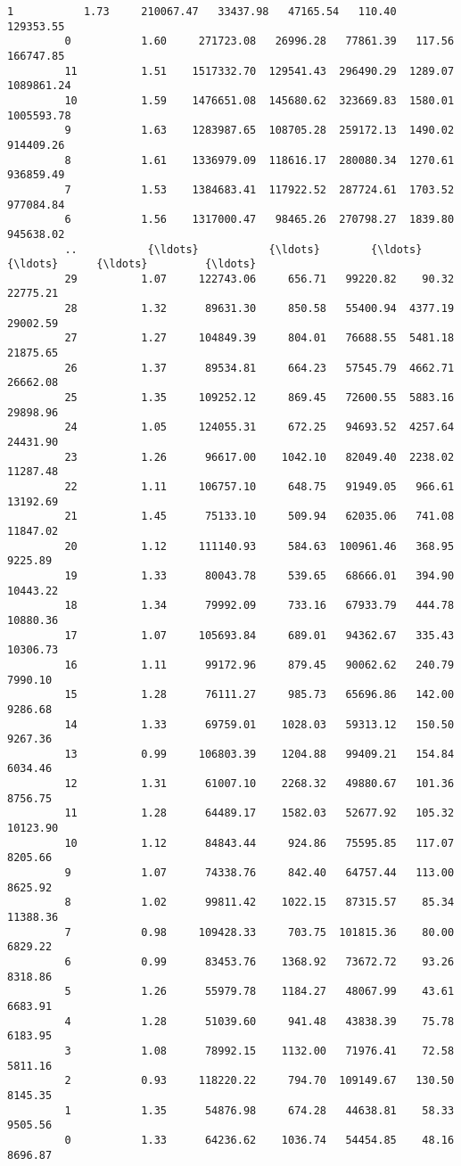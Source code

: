 \documentclass[11pt]{article}
\begin{document}
\begin{Verbatim}[commandchars=\\\{\}]
         1           1.73     210067.47   33437.98   47165.54   110.40   129353.55
         0           1.60     271723.08   26996.28   77861.39   117.56   166747.85
         11          1.51    1517332.70  129541.43  296490.29  1289.07  1089861.24
         10          1.59    1476651.08  145680.62  323669.83  1580.01  1005593.78
         9           1.63    1283987.65  108705.28  259172.13  1490.02   914409.26
         8           1.61    1336979.09  118616.17  280080.34  1270.61   936859.49
         7           1.53    1384683.41  117922.52  287724.61  1703.52   977084.84
         6           1.56    1317000.47   98465.26  270798.27  1839.80   945638.02
         ..           {\ldots}           {\ldots}        {\ldots}        {\ldots}      {\ldots}         {\ldots}
         29          1.07     122743.06     656.71   99220.82    90.32    22775.21
         28          1.32      89631.30     850.58   55400.94  4377.19    29002.59
         27          1.27     104849.39     804.01   76688.55  5481.18    21875.65
         26          1.37      89534.81     664.23   57545.79  4662.71    26662.08
         25          1.35     109252.12     869.45   72600.55  5883.16    29898.96
         24          1.05     124055.31     672.25   94693.52  4257.64    24431.90
         23          1.26      96617.00    1042.10   82049.40  2238.02    11287.48
         22          1.11     106757.10     648.75   91949.05   966.61    13192.69
         21          1.45      75133.10     509.94   62035.06   741.08    11847.02
         20          1.12     111140.93     584.63  100961.46   368.95     9225.89
         19          1.33      80043.78     539.65   68666.01   394.90    10443.22
         18          1.34      79992.09     733.16   67933.79   444.78    10880.36
         17          1.07     105693.84     689.01   94362.67   335.43    10306.73
         16          1.11      99172.96     879.45   90062.62   240.79     7990.10
         15          1.28      76111.27     985.73   65696.86   142.00     9286.68
         14          1.33      69759.01    1028.03   59313.12   150.50     9267.36
         13          0.99     106803.39    1204.88   99409.21   154.84     6034.46
         12          1.31      61007.10    2268.32   49880.67   101.36     8756.75
         11          1.28      64489.17    1582.03   52677.92   105.32    10123.90
         10          1.12      84843.44     924.86   75595.85   117.07     8205.66
         9           1.07      74338.76     842.40   64757.44   113.00     8625.92
         8           1.02      99811.42    1022.15   87315.57    85.34    11388.36
         7           0.98     109428.33     703.75  101815.36    80.00     6829.22
         6           0.99      83453.76    1368.92   73672.72    93.26     8318.86
         5           1.26      55979.78    1184.27   48067.99    43.61     6683.91
         4           1.28      51039.60     941.48   43838.39    75.78     6183.95
         3           1.08      78992.15    1132.00   71976.41    72.58     5811.16
         2           0.93     118220.22     794.70  109149.67   130.50     8145.35
         1           1.35      54876.98     674.28   44638.81    58.33     9505.56
         0           1.33      64236.62    1036.74   54454.85    48.16     8696.87
         

\end{Verbatim}
\end{document}

